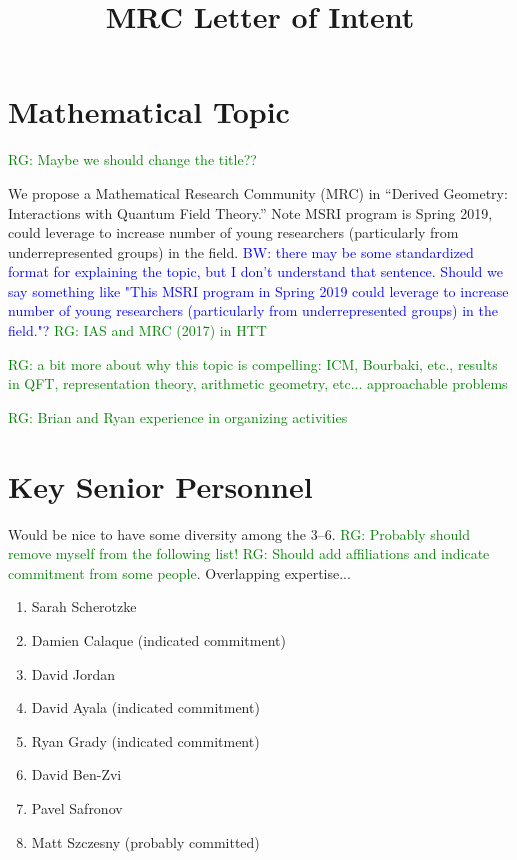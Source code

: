 \documentclass[11pt]{amsart}
\title{MRC Letter of Intent}
\def\brian{\textcolor{blue}{BW: }\textcolor{blue}}
\def\ryan{\textcolor{green}{RG: }\textcolor{green}}
\begin{document}
\maketitle

\section*{Mathematical Topic}

\ryan{Maybe we should change the title??}

We propose a Mathematical Research Community (MRC) in ``Derived Geometry: Interactions with Quantum Field Theory.'' Note MSRI program is Spring 2019, could leverage to increase number of young researchers (particularly from underrepresented groups) in the field. \brian{there may be some standardized format for explaining the topic, but I don't understand that sentence. Should we say something like
"This MSRI program in Spring 2019 could leverage to increase number of young researchers (particularly from underrepresented groups) in the field."?} \ryan{IAS
and MRC (2017) in HTT}

\ryan{a bit more about why this topic is compelling: ICM, Bourbaki, etc., results in QFT, representation theory, arithmetic geometry, etc... approachable problems}

\ryan{Brian and Ryan experience in organizing activities}

\section*{Key Senior Personnel} Would be nice to have some diversity among the 3--6. \ryan{Probably should remove myself from the following list!} \ryan{Should add affiliations and indicate commitment from some people}. Overlapping expertise...

\begin{enumerate}
\item \label{Sarah} Sarah Scherotzke
\item \label{Damien} Damien Calaque (indicated commitment)
\item \label{DavidJ} David Jordan
\item \label{DavidA} David Ayala (indicated commitment)
\item \label{Ryan} Ryan Grady (indicated commitment)
\item \label{DavidBZ} David Ben-Zvi
\item \label{PavelS} Pavel Safronov
\item \label{Matt} Matt Szczesny (probably committed)
\end{enumerate}
\end{document}
